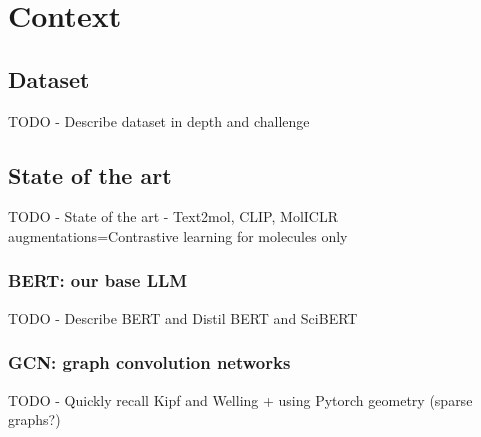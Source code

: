 \section{Context}
\label{sec:Context}


\subsection{Dataset}
\label{sec:sota}

\color{red}TODO - Describe dataset in depth and challenge \color{black}


\subsection{State of the art}
\label{sec:sota}

\color{red}TODO - State of the art - Text2mol, CLIP, MolICLR augmentations=Contrastive learning for molecules only\color{black}



\subsubsection{BERT: our base LLM}
\label{sec:bert}
\color{red}TODO - Describe BERT and Distil BERT and SciBERT\color{black}



\subsubsection{GCN: graph convolution networks}
\label{sec:GCN}
\color{red}TODO - Quickly recall Kipf and Welling + using Pytorch geometry (sparse graphs?)\color{black}